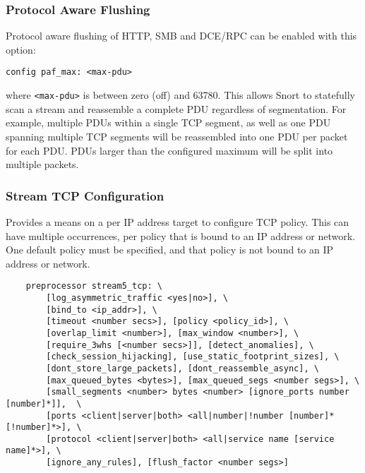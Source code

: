 \documentclass[english]{report}
\begin{document}
\subsubsection{Protocol Aware Flushing}

Protocol aware flushing of HTTP, SMB and DCE/RPC can be enabled with this option:

\begin{verbatim}
config paf_max: <max-pdu>
\end{verbatim}

where \texttt{<max-pdu>} is between zero (off) and 63780.  This allows Snort to
statefully scan a stream and reassemble a complete PDU regardless of
segmentation.  For example, multiple PDUs within a single TCP segment, as well
as one PDU spanning multiple TCP segments will be reassembled into one PDU per
packet for each PDU.  PDUs larger than the configured maximum will be split
into multiple packets.

\subsubsection{Stream TCP Configuration}

Provides a means on a per IP address target to configure TCP policy.  This can
have multiple occurrences, per policy that is bound to an IP address or network.
One default policy must be specified, and that policy is not bound to an IP
address or network.

\begin{verbatim}
    preprocessor stream5_tcp: \
        [log_asymmetric_traffic <yes|no>], \
        [bind_to <ip_addr>], \
        [timeout <number secs>], [policy <policy_id>], \
        [overlap_limit <number>], [max_window <number>], \
        [require_3whs [<number secs>]], [detect_anomalies], \
        [check_session_hijacking], [use_static_footprint_sizes], \
        [dont_store_large_packets], [dont_reassemble_async], \
        [max_queued_bytes <bytes>], [max_queued_segs <number segs>], \
        [small_segments <number> bytes <number> [ignore_ports number [number]*]],  \
        [ports <client|server|both> <all|number|!number [number]* [!number]*>], \
        [protocol <client|server|both> <all|service name [service name]*>], \
        [ignore_any_rules], [flush_factor <number segs>]
\end{verbatim}
\end{document}
